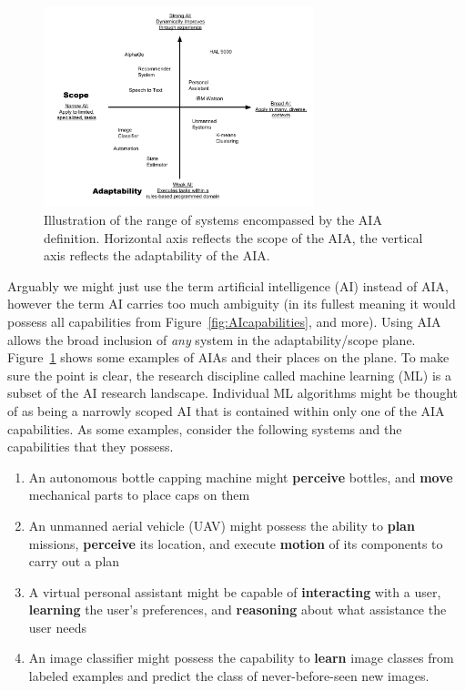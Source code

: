 	\begin{figure}[htbp]
    	\centering
     	\includegraphics[width=0.7\textwidth]{Figures/strong_weak_narrow_broad.pdf}
    	\caption{Illustration of the range of systems encompassed by the AIA definition. Horizontal axis reflects the scope of the AIA, the vertical axis reflects the adaptability of the AIA.}
        \label{fig:StrongWeak}
    \end{figure}

  Arguably we might just use the term artificial intelligence (AI) instead of AIA, however the term AI carries too much ambiguity (in its fullest meaning it would possess all capabilities from Figure~\ref{fig:AIcapabilities}, and more). Using AIA allows the broad inclusion of \emph{any} system in the adaptability/scope plane. Figure~\ref{fig:StrongWeak} shows some examples of AIAs and their places on the plane. To make sure the point is clear, the research discipline called machine learning (ML) is a subset of the AI research landscape. Individual ML algorithms might be thought of as being a narrowly scoped AI that is contained within only one of the AIA capabilities. As some examples, consider the following systems and the capabilities that they possess.

    \begin{enumerate}
         \item An autonomous bottle capping machine might \textbf{perceive} bottles, and \textbf{move} mechanical parts to place caps on them
         \item An unmanned aerial vehicle (UAV) might possess the ability to \textbf{plan} missions, \textbf{perceive} its location, and execute \textbf{motion} of its components to carry out a plan
         \item A virtual personal assistant might be capable of \textbf{interacting} with a user, \textbf{learning} the user's preferences, and \textbf{reasoning} about what assistance the user needs
         \item An image classifier might possess the capability to \textbf{learn} image classes from labeled examples and predict the class of never-before-seen new images.
     \end{enumerate}

